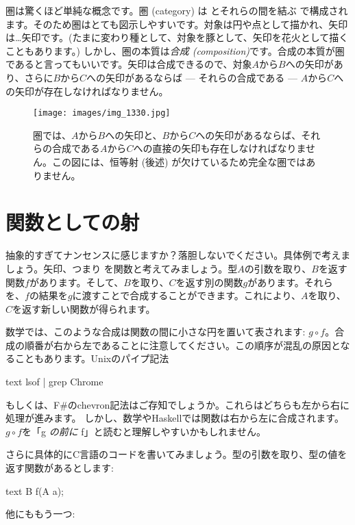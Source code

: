 
\lettrine[lhang=0.17]{圏}{は}驚くほど単純な概念です。圏 (category) は とそれらの間を結ぶ で構成されます。そのため圏はとても図示しやすいです。対象は円や点として描かれ、矢印は\ldots{}矢印です。(たまに変わり種として、対象を豚として、矢印を花火として描くこともあります。) しかし、圏の本質は\emph{合成 (composition)}です。合成の本質が圏であると言ってもいいです。矢印は合成できるので、対象$A$から$B$への矢印があり、さらに$B$から$C$への矢印があるならば --- それらの合成である --- $A$から$C$への矢印が存在しなければなりません。

\begin{figure}
  \centering
  \texttt{[image: images/img\_1330.jpg]}
  \caption{圏では、$A$から$B$への矢印と、$B$から$C$への矢印があるならば、それらの合成である$A$から$C$への直接の矢印も存在しなければなりません。この図には、恒等射 (後述) が欠けているため完全な圏ではありません。}
\end{figure}

\section{関数としての射}

抽象的すぎてナンセンスに感じますか？落胆しないでください。具体例で考えましょう。矢印、つまり を関数と考えてみましょう。型$A$の引数を取り、$B$を返す関数$f$があります。そして、$B$を取り、$C$を返す別の関数$g$があります。それらを、$f$の結果を$g$に渡すことで合成することができます。これにより、$A$を取り、$C$を返す新しい関数が得られます。

数学では、このような合成は関数の間に小さな円を置いて表されます: $g \circ f$。合成の順番が右から左であることに注意してください。この順序が混乱の原因となることもあります。Unixのパイプ記法
\begin{snip}{text}
lsof | grep Chrome
\end{snip}
もしくは、F\#のchevron記法\code{>>}はご存知でしょうか。これらはどちらも左から右に処理が進みます。
しかし、数学やHaskellでは関数は右から左に合成されます。$g \circ f$を「g \emph{の前に} f」と読むと理解しやすいかもしれません。

さらに具体的にC言語のコードを書いてみましょう。型の引数を取り、型の値を返す関数があるとします:

\begin{snip}{text}
B f(A a);
\end{snip}
他にももう一つ:

